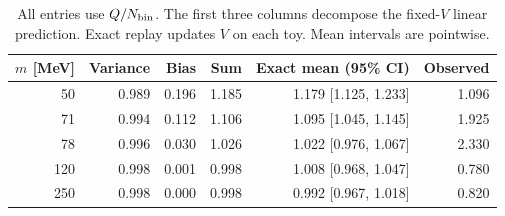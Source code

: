 \begin{table}[H]\centering\small
\begin{tabular}{rrrrrr}\toprule
$m$ [MeV] & Variance & Bias & Sum & Exact mean (95\% CI) & Observed\\\midrule
50 & 0.989 & 0.196 & 1.185 & 1.179 [1.125, 1.233] & 1.096\\
71 & 0.994 & 0.112 & 1.106 & 1.095 [1.045, 1.145] & 1.925\\
78 & 0.996 & 0.030 & 1.026 & 1.022 [0.976, 1.067] & 2.330\\
120 & 0.998 & 0.001 & 0.998 & 1.008 [0.968, 1.047] & 0.780\\
250 & 0.998 & 0.000 & 0.998 & 0.992 [0.967, 1.018] & 0.820\\
\bottomrule\end{tabular}
\caption{All entries use $Q/N_{\rm bin}$. The first three columns decompose the fixed-$V$ linear prediction. Exact replay updates $V$ on each toy. Mean intervals are pointwise.}\end{table}
